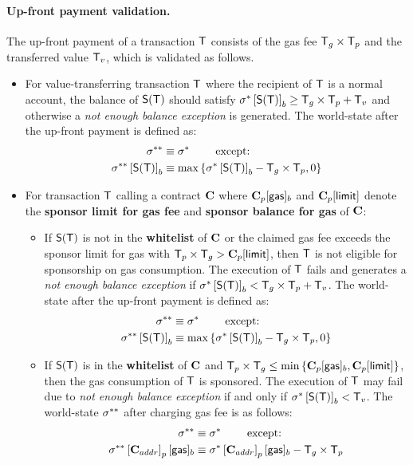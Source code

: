 \paragraph{Up-front payment validation.}

The up-front payment of a transaction $\textsf{T}$ consists of the gas fee $\textsf{T}_g\times\textsf{T}_p$ and the transferred value $\textsf{T}_v$, which is validated as follows.

\begin{itemize}[nosep]
	\item For value-transferring transaction $\textsf{T}$ where the recipient of $\textsf{T}$ is a normal account,
	the balance of $\mathsf{S}{\left({\textsf{T}} \right)}$ should satisfy $\mathbf{\sigma}^{*} \left[\mathsf{S}{\left({\textsf{T}} \right)}\right]_b \ge \textsf{T}_g\times\textsf{T}_p+\textsf{T}_v$ and otherwise a \emph{not enough balance exception} is generated. 
	The world-state after the up-front payment is defined as: 
	\begin{align}
		\mathbf{\sigma}^{**}  &\equiv \mathbf{\sigma}^* \qquad \mbox{  except:}\\
		\mathbf{\sigma}^{**} \left[\mathsf{S}{\left({\textsf{T}} \right)}\right]_b &\equiv \max{\left \{{\ensuremath{\mathbf{\sigma}}^*\left[\ensuremath{\mathsf{S}{\left({\textsf{T}} \right)}}\right]_b-\textsf{T}_g\times\textsf{T}_p,0} \right \}}
	\end{align}

	\item For transaction $\textsf{T}$ calling a contract $\mathbf{C}$ where $\mathbf{C}_p[{\sf gas}]_b$ and $\mathbf{C}_p[{\sf limit}]$ denote the \textbf{sponsor limit for gas fee} and \textbf{sponsor balance for gas} of $\mathbf{C}$:
	\begin{itemize}
		\item If $\mathsf{S}{\left({\textsf{T}} \right)}$ is not in the \textbf{whitelist} of $\mathbf{C}$ or the claimed gas fee exceeds the sponsor limit for gas with $\textsf{T}_p\times \textsf{T}_g > \mathbf{C}_p[{\sf limit}]$, then ${\textsf{T}}$ is not eligible for sponsorship on gas consumption.
		The execution of $\textsf{T}$ fails and generates a \emph{not enough balance exception} if $\mathbf{\sigma}^{*} \left[\mathsf{S}{\left({\textsf{T}} \right)}\right]_b<\textsf{T}_g\times\textsf{T}_p+\textsf{T}_v$.
		The world-state after the up-front payment is defined as: 
		\begin{align}
			\mathbf{\sigma}^{**}  &\equiv \mathbf{\sigma}^* \qquad \mbox{  except:} \label{eq:st after gas fee}\\
			\mathbf{\sigma}^{**} \left[\mathsf{S}{\left({\textsf{T}} \right)}\right]_b &\equiv \max{\left \{{\ensuremath{\mathbf{\sigma}}^*\left[\ensuremath{\mathsf{S}{\left({\textsf{T}} \right)}}\right]_b-\textsf{T}_g\times\textsf{T}_p,0} \right \}}
		\end{align}


		\item If $\mathsf{S}{\left({\textsf{T}} \right)}$ is in the \textbf{whitelist} of $\mathbf{C}$ and $\textsf{T}_p\times \textsf{T}_g \le \min{\left \{{\ensuremath{\mathbf{C}}_p[{\sf gas}]_b,\ensuremath{\mathbf{C}}_p[{\sf limit}]} \right \}}$,
		then the gas consumption of $\textsf{T}$ is sponsored.
		The execution of $\textsf{T}$ may fail due to \emph{not enough balance exception} if and only if $\mathbf{\sigma}^{*} \left[\mathsf{S}{\left({\textsf{T}} \right)}\right]_b<\textsf{T}_v$.
		The world-state $\mathbf{\sigma}^{**}$ after charging gas fee is as follows: 
		\begin{align}
			\mathbf{\sigma}^{**}  &\equiv \mathbf{\sigma}^* \qquad \mbox{  except:}\\
			\mathbf{\sigma}^{**}\left[\mathbf{C}_{addr}\right]_p[{\sf gas}]_b &\equiv \mathbf{\sigma}^*\left[\mathbf{C}_{addr}\right]_p[{\sf gas}]_b-\textsf{T}_g\times\textsf{T}_p
		\end{align}


\end{itemize}
\end{itemize}
